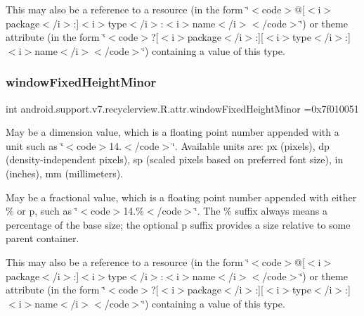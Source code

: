This may also be a reference to a resource (in the form \char`\"{}$<$code$>$@\mbox{[}$<$i$>$package$<$/i$>$\+:\mbox{]}$<$i$>$type$<$/i$>$\+:$<$i$>$name$<$/i$>$$<$/code$>$\char`\"{}) or theme attribute (in the form \char`\"{}$<$code$>$?\mbox{[}$<$i$>$package$<$/i$>$\+:\mbox{]}\mbox{[}$<$i$>$type$<$/i$>$\+:\mbox{]}$<$i$>$name$<$/i$>$$<$/code$>$\char`\"{}) containing a value of this type. \mbox{\label{classandroid_1_1support_1_1v7_1_1recyclerview_1_1R_1_1attr_aed93b3ff11b45886f6d7ea4b7bf4f098}} 
\subsubsection{\texorpdfstring{window\+Fixed\+Height\+Minor}{windowFixedHeightMinor}}
{\footnotesize\ttfamily int android.\+support.\+v7.\+recyclerview.\+R.\+attr.\+window\+Fixed\+Height\+Minor =0x7f010051\hspace{0.3cm}{\ttfamily [static]}}

May be a dimension value, which is a floating point number appended with a unit such as \char`\"{}$<$code$>$14.\+5sp$<$/code$>$\char`\"{}. Available units are\+: px (pixels), dp (density-\/independent pixels), sp (scaled pixels based on preferred font size), in (inches), mm (millimeters). 

May be a fractional value, which is a floating point number appended with either \% or p, such as \char`\"{}$<$code$>$14.\%$<$/code$>$\char`\"{}. The \% suffix always means a percentage of the base size; the optional p suffix provides a size relative to some parent container. 

This may also be a reference to a resource (in the form \char`\"{}$<$code$>$@\mbox{[}$<$i$>$package$<$/i$>$\+:\mbox{]}$<$i$>$type$<$/i$>$\+:$<$i$>$name$<$/i$>$$<$/code$>$\char`\"{}) or theme attribute (in the form \char`\"{}$<$code$>$?\mbox{[}$<$i$>$package$<$/i$>$\+:\mbox{]}\mbox{[}$<$i$>$type$<$/i$>$\+:\mbox{]}$<$i$>$name$<$/i$>$$<$/code$>$\char`\"{}) containing a value of this type. \mbox{\label{classandroid_1_1support_1_1v7_1_1recyclerview_1_1R_1_1attr_a93959c8030eab1a88df8ce823c050197}} 
